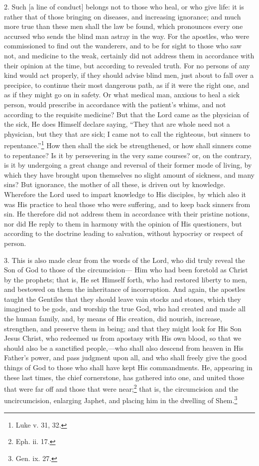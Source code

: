 2. Such [a line of conduct] belongs not to those who heal, or who give life: it is rather that of those bringing on diseases, and increasing ignorance; and much more true than these men shall the law be found, which pronounces every one accursed who sends the blind man astray in the way. For the apostles, who were commissioned to find out the wanderers, and to be for sight to those who saw not, and medicine to the weak, certainly did not address them in accordance with their opinion at the time, but according to revealed truth. For no persons of any kind would act properly, if they should advise blind men, just about to fall over a precipice, to continue their most dangerous path, as if it were the right one, and as if they might go on in safety. Or what medical man, anxious to heal a sick person, would prescribe in accordance with the patient’s whims, and not according to the requisite medicine? But that the Lord came as the physician of the sick, He does Himself declare saying, “They that are whole need not a physician, but they that are sick; I came not to call the righteous, but sinners to repentance.”\footnote{Luke v. 31, 32.} How then shall the sick be strengthened, or how shall sinners come to repentance? Is it by persevering in the very same courses? or, on the contrary, is it by undergoing a great change and reversal of their former mode of living, by which they have brought upon themselves no slight amount of sickness, and many sins? But ignorance, the mother of all these, is driven out by knowledge. Wherefore the Lord used to impart knowledge to His disciples, by which also it was His practice to heal those who were suffering, and to keep back sinners from sin. He therefore did not address them in accordance with their pristine notions, nor did He reply to them in harmony with the opinion of His questioners, but according to the doctrine leading to salvation, without hypocrisy or respect of person.

3. This is also made clear from the words of the Lord, who did truly reveal the Son of God to those of the circumcision— Him who had been foretold as Christ by the prophets; that is, He set Himself forth, who had restored liberty to men, and bestowed on them the inheritance of incorruption. And again, the apostles taught the Gentiles that they should leave vain stocks and stones, which they imagined to be gods, and worship the true God, who had created and made all the human family, and, by means of His creation, did nourish, increase, strengthen, and preserve them in being; and that they might look for His Son Jesus Christ, who redeemed us from apostasy with His own blood, so that we should also be a sanctified people,—who shall also descend from heaven in His Father’s power, and pass judgment upon all, and who shall freely give the good things of God to those who shall have kept His commandments. He, appearing in these last times, the chief cornerstone, has gathered into one, and united those that were far off and those that were near;\footnote{Eph. ii. 17.} that is, the circumcision and the uncircumcision, enlarging Japhet, and placing him in the dwelling of Shem.\footnote{Gen. ix. 27.}


